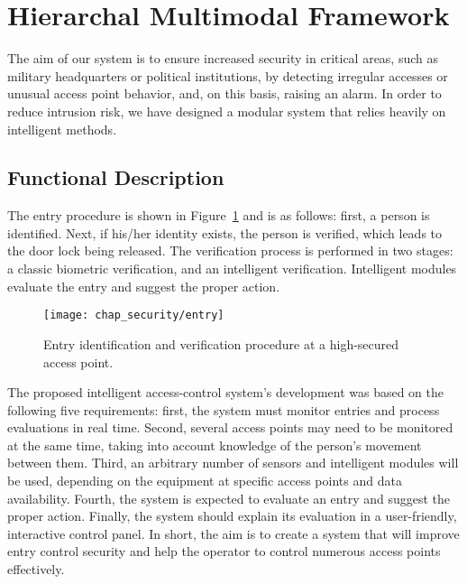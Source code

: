 %
%


%
%

\section{Hierarchal Multimodal Framework}
\label{sec:system}


The aim of our system is to ensure increased security in critical areas, such as military headquarters or political institutions, by detecting irregular accesses or unusual access point behavior, and, on this basis, raising an alarm. In order to reduce intrusion risk, we have designed a modular system that relies heavily on intelligent methods.

\subsection{Functional Description}
\label{sec:system:description}

The entry procedure is shown in Figure~\ref{fig:procedure} and is as follows: first, a person is identified. Next, if his/her identity exists, the person is verified, which leads to the door lock being released. The verification process is performed in two stages: a classic biometric verification, and an intelligent verification. Intelligent modules evaluate the entry and suggest the proper action.

\begin{figure}[!ht]
\centering
\texttt{[image: chap\_security/entry]}
\caption{Entry identification and verification procedure at a high-secured access point.}
\label{fig:procedure}
\end{figure}

The proposed intelligent access-control system's development was based on the following five requirements: first, the system must monitor entries and process evaluations in real time. Second, several access points may need to be monitored at the same time, taking into account knowledge of the person's movement between them. Third, an arbitrary number of sensors and intelligent modules will be used, depending on the equipment at specific access points and data availability. Fourth, the system is expected to evaluate an entry and suggest the proper action. Finally, the system should explain its evaluation in a user-friendly, interactive control panel. In short, the aim is to create a system that will improve entry control security and help the operator to control numerous access points effectively. 


